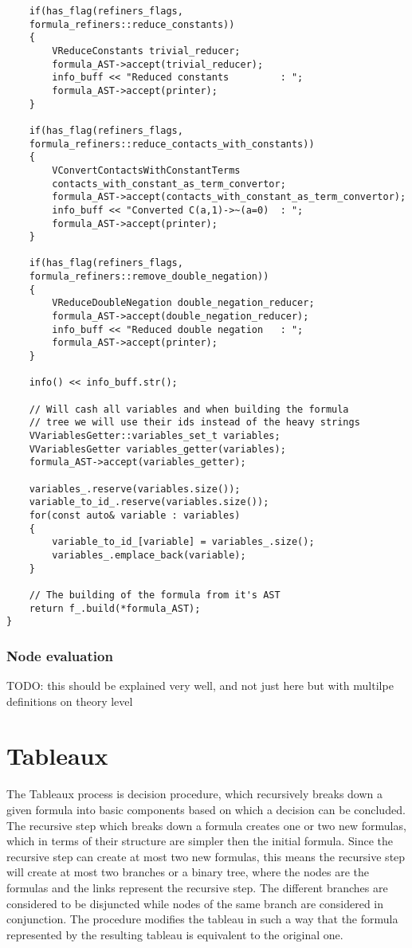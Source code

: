 \documentclass{article}
\begin{document}
\begin{lstlisting}
    if(has_flag(refiners_flags, 
	formula_refiners::reduce_constants))
    {
        VReduceConstants trivial_reducer;
        formula_AST->accept(trivial_reducer);
        info_buff << "Reduced constants         : ";
        formula_AST->accept(printer);
    }

    if(has_flag(refiners_flags, 
	formula_refiners::reduce_contacts_with_constants))
    {
        VConvertContactsWithConstantTerms 
		contacts_with_constant_as_term_convertor;
        formula_AST->accept(contacts_with_constant_as_term_convertor);
        info_buff << "Converted C(a,1)->~(a=0)  : ";
        formula_AST->accept(printer);
    }

    if(has_flag(refiners_flags, 
	formula_refiners::remove_double_negation))
    {
        VReduceDoubleNegation double_negation_reducer;
        formula_AST->accept(double_negation_reducer);
        info_buff << "Reduced double negation   : ";
        formula_AST->accept(printer);
    }

    info() << info_buff.str();

    // Will cash all variables and when building the formula 
    // tree we will use their ids instead of the heavy strings
    VVariablesGetter::variables_set_t variables;
    VVariablesGetter variables_getter(variables);
    formula_AST->accept(variables_getter);

    variables_.reserve(variables.size());
    variable_to_id_.reserve(variables.size());
    for(const auto& variable : variables)
    {
        variable_to_id_[variable] = variables_.size();
        variables_.emplace_back(variable);
    }

    // The building of the formula from it's AST
    return f_.build(*formula_AST); 
}
			\end{lstlisting}

	\subsubsection*{Node evaluation}
		TODO: this should be explained very well, and not just here but with multilpe definitions on theory level
		

	\section{Tableaux}
	The Tableaux process is decision procedure, which recursively breaks down a given formula into basic components 
	based on which a decision can be concluded. The recursive step which breaks down a formula creates one or two 
	new formulas, which in terms of their structure are simpler then the initial formula. Since the recursive step can create
	at most two new formulas, this means the recursive step will create at most two branches or a binary tree, where the nodes
	are the formulas and the links represent the recursive step. The different branches are considered to be disjuncted while
   	nodes of the same branch are considered in conjunction. The procedure modifies the tableau in such a way that the 
	formula represented by the resulting tableau is equivalent to the original one.
\end{document}
